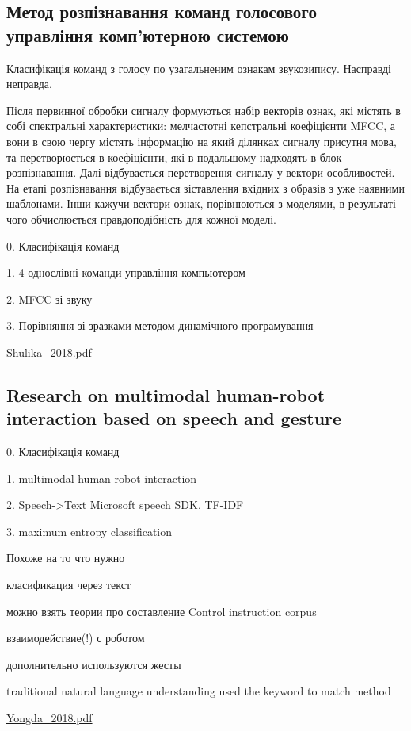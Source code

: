 \subsection{Метод розпізнавання команд голосового управління комп’ютерною системою}

Класифікація команд з голосу по узагальненим ознакам звукозипису. Насправді неправда.

Після первинної обробки сигналу формуються
набір векторів ознак, які містять в собі спектральні характеристики: мелчастотні
кепстральні коефіцієнти MFCC, а вони в свою чергу містять
інформацію на який ділянках сигналу присутня мова, та перетворюється в
коефіцієнти, які в подальшому надходять в блок розпізнавання. Далі
відбувається перетворення сигналу у вектори особливостей. На етапі
розпізнавання відбувається зіставлення вхідних з образів з уже наявними
шаблонами. Інши кажучи вектори ознак, порівнюються з моделями, в
результаті чого обчислюється правдоподібність для кожної моделі. 

0. Класифікація команд

1. 4 однослівні команди управління компьютером

2. MFCC зі звуку

3. Порівняння зі зразками методом динамічного програмування

\url{Shulika_2018.pdf}\cite{Shulika_2018}

\subsection{Research on multimodal human-robot interaction based on speech and gesture}

0. Класифікація команд

1. multimodal human-robot interaction

2. Speech->Text Microsoft speech SDK. TF-IDF

3. maximum entropy classification

Похоже на то что нужно

класификация через текст

можно взять теории про составление Control instruction corpus

взаимодействие(!) с роботом

дополнительно используются жесты

traditional natural language understanding used the keyword to match method

\url{Yongda_2018.pdf}\cite{Yongda_2018}

